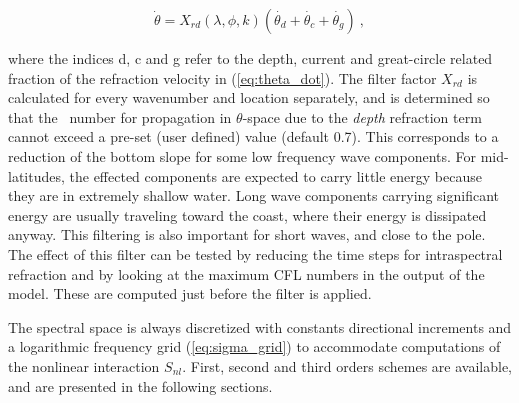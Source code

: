 
\begin{equation}
\dot{\theta} = X_{rd}(\lambda,\phi,k)\left( \dot{\theta_d} + 
\dot{\theta_c} + \dot{\theta_g} \right)\: , \label{eq:theta_filter} \end{equation}

\noindent
where the indices d, c and g refer to the depth, current and great-circle
related fraction of the refraction velocity in (\ref{eq:theta_dot}). The
filter factor $X_{rd}$ is calculated for every wavenumber and location
separately, and is determined so that the \cfl\ number for propagation in
$\theta$-space due to the {\em depth} refraction term cannot exceed a pre-set
(user defined) value (default 0.7). This corresponds to a reduction of the
bottom slope for some low frequency wave components. For mid-latitudes, the
effected components are expected to carry little energy because they are in
extremely shallow water. Long wave components carrying significant energy are
usually traveling toward the coast, where their energy is dissipated
anyway. This filtering is also important for short waves, and close to the
pole. The effect of this filter can be tested by reducing the time steps for
intraspectral refraction and by looking at the maximum CFL numbers in the
output of the model.  These are computed just before the filter is applied.


\vspace{\baselineskip} \noindent 
The spectral space is always discretized with constants directional increments
and a logarithmic frequency grid (\ref{eq:sigma_grid}) to accommodate
computations of the nonlinear interaction $S_{nl}$. First, second and third
orders schemes are available, and are presented in the following sections.